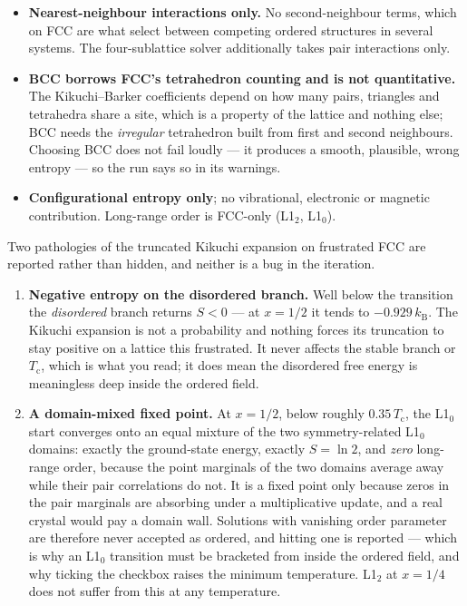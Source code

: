 \begin{itemize}[leftmargin=1.4em]
  \item \textbf{Nearest-neighbour interactions only.} No second-neighbour terms,
    which on FCC are what select between competing ordered structures in several
    systems. The four-sublattice solver additionally takes pair interactions
    only.
  \item \textbf{BCC borrows FCC's tetrahedron counting and is not
    quantitative.} The Kikuchi--Barker coefficients depend on how many pairs,
    triangles and tetrahedra share a site, which is a property of the lattice
    and nothing else; BCC needs the \emph{irregular} tetrahedron built from
    first and second neighbours. Choosing BCC does not fail loudly --- it
    produces a smooth, plausible, wrong entropy --- so the run says so in its
    warnings.
  \item \textbf{Configurational entropy only}; no vibrational, electronic or
    magnetic contribution. Long-range order is FCC-only (L1$_2$, L1$_0$).
\end{itemize}

Two pathologies of the truncated Kikuchi expansion on frustrated FCC are
reported rather than hidden, and neither is a bug in the iteration.

\begin{enumerate}
  \item \textbf{Negative entropy on the disordered branch.} Well below the
    transition the \emph{disordered} branch returns $S < 0$ --- at $x = 1/2$ it
    tends to $-0.929\,k_\mathrm{B}$. The Kikuchi expansion is not a probability
    and nothing forces its truncation to stay positive on a lattice this
    frustrated. It never affects the stable branch or $T_\mathrm{c}$, which is
    what you read; it does mean the disordered free energy is meaningless deep
    inside the ordered field.
  \item \textbf{A domain-mixed fixed point.} At $x = 1/2$, below roughly
    $0.35\,T_\mathrm{c}$, the L1$_0$ start converges onto an equal mixture of
    the two symmetry-related L1$_0$ domains: exactly the ground-state energy,
    exactly $S = \ln 2$, and \emph{zero} long-range order, because the point
    marginals of the two domains average away while their pair correlations do
    not. It is a fixed point only because zeros in the pair marginals are
    absorbing under a multiplicative update, and a real crystal would pay a
    domain wall. Solutions with vanishing order parameter are therefore never
    accepted as ordered, and hitting one is reported --- which is why an
    L1$_0$ transition must be bracketed from inside the ordered field, and why
    ticking the checkbox raises the minimum temperature. L1$_2$ at $x = 1/4$
    does not suffer from this at any temperature.
\end{enumerate}

